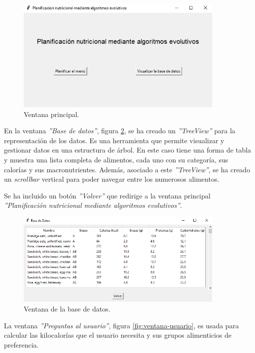 \begin{figure}[H]
    \centering
    \includegraphics[width=0.9\textwidth]{figures/ventana-main.png}
    \caption{Ventana principal.}
    \label{fig:ventana-main}
\end{figure}

En la ventana \textit{''Base de datos''}, figura \ref{fig:ventana-basedatos}, se ha creado un \textit{''TreeView''} para la representación de los datos. Es una herramienta que permite visualizar y gestionar datos en una estructura de árbol. En este caso tiene una forma de tabla y muestra una lista completa de alimentos, cada uno con su categoría, sus calorías y sus macronutrientes. Además, asociado a este \textit{''TreeView''}, se ha creado un \textit{scrollbar} vertical para poder navegar entre los numerosos alimentos.

Se ha incluido un botón \textit{''Volver''} que redirige a la ventana principal \textit{''Planificación nutricional mediante algoritmos evolutivos''}.

\begin{figure}[H]
    \centering
    \includegraphics[width=0.9\textwidth]{figures/ventana-basedatos.png}
    \caption{Ventana de la base de datos.}
    \label{fig:ventana-basedatos}
\end{figure}

La ventana \textit{''Preguntas al usuario''}, figura \ref{fig:ventana-usuario}, es usada para calcular las kilocalorías que el usuario necesita y sus grupos alimenticios de preferencia.


